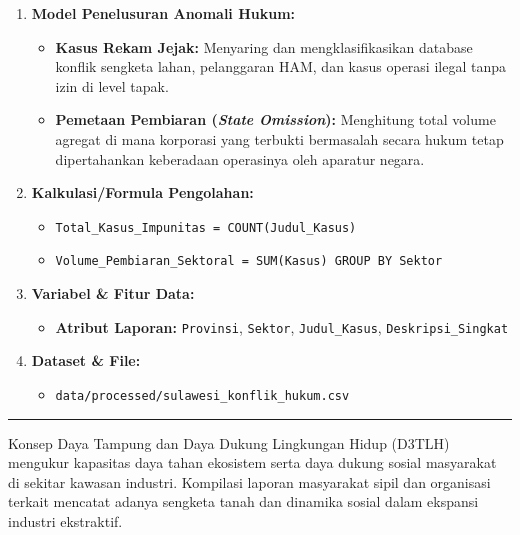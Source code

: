\documentclass[
]{article}
\providecommand{\tightlist}{%
  \setlength{\itemsep}{0pt}\setlength{\parskip}{0pt}}
\begin{document}
\begin{enumerate}
\def\labelenumi{\arabic{enumi}.}
\tightlist
\item
  \textbf{Model Penelusuran Anomali Hukum:}

  \begin{itemize}
  \tightlist
  \item
    \textbf{Kasus Rekam Jejak:} Menyaring dan mengklasifikasikan
    database konflik sengketa lahan, pelanggaran HAM, dan kasus operasi
    ilegal tanpa izin di level tapak.
  \item
    \textbf{Pemetaan Pembiaran (\emph{State Omission}):} Menghitung
    total volume agregat di mana korporasi yang terbukti bermasalah
    secara hukum tetap dipertahankan keberadaan operasinya oleh aparatur
    negara.
  \end{itemize}
\item
  \textbf{Kalkulasi/Formula Pengolahan:}

  \begin{itemize}
  \tightlist
  \item
    \texttt{Total\_Kasus\_Impunitas\ =\ COUNT(Judul\_Kasus)}
  \item
    \texttt{Volume\_Pembiaran\_Sektoral\ =\ SUM(Kasus)\ GROUP\ BY\ Sektor}
  \end{itemize}
\item
  \textbf{Variabel \& Fitur Data:}

  \begin{itemize}
  \tightlist
  \item
    \textbf{Atribut Laporan:} \texttt{Provinsi}, \texttt{Sektor},
    \texttt{Judul\_Kasus}, \texttt{Deskripsi\_Singkat}
  \end{itemize}
\item
  \textbf{Dataset \& File:}

  \begin{itemize}
  \tightlist
  \item
    \texttt{data/processed/sulawesi\_konflik\_hukum.csv}
  \end{itemize}
\end{enumerate}

\begin{center}\rule{0.5\linewidth}{0.5pt}\end{center}

Konsep Daya Tampung dan Daya Dukung Lingkungan Hidup (D3TLH) mengukur
kapasitas daya tahan ekosistem serta daya dukung sosial masyarakat di
sekitar kawasan industri. Kompilasi laporan masyarakat sipil dan
organisasi terkait mencatat adanya sengketa tanah dan dinamika sosial
dalam ekspansi industri ekstraktif.
\end{document}
